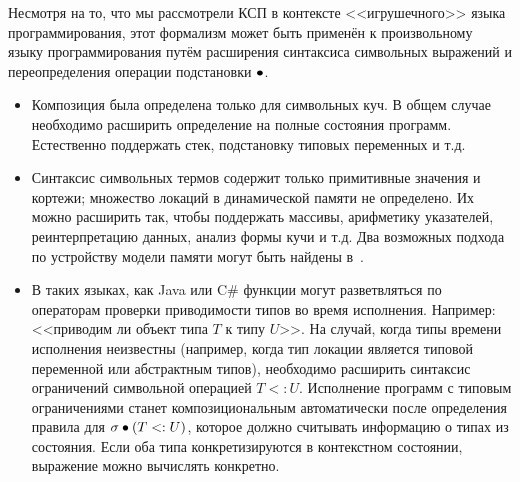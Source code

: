 \begin{remk*}
Несмотря на то, что мы рассмотрели КСП в контексте <<игрушечного>> языка программирования, этот формализм может быть применён к произвольному языку программирования путём расширения синтаксиса символьных выражений и переопределения операции подстановки $\bullet$.
\begin{itemize}
\item Композиция была определена только для символьных куч. В общем случае необходимо расширить определение на полные состояния программ. Естественно поддержать стек, подстановку типовых переменных и т.д.
\item Синтаксис символьных термов содержит только примитивные значения и кортежи; множество локаций в динамической памяти не определено. Их можно расширить так, чтобы поддержать массивы, арифметику указателей, реинтерпретацию данных, анализ формы кучи и т.д. Два возможных подхода по устройству модели памяти могут быть найдены в~\cite{dudka2013byte,gurfinkel2017context}.
\item В таких языках, как Java или C\# функции могут разветвляться по операторам проверки приводимости типов во время исполнения. Например: <<приводим ли объект типа $T$ к типу $U$>>. На случай, когда типы времени исполнения неизвестны (например, когда тип локации является типовой переменной или абстрактным типов), необходимо расширить синтаксис ограничений символьной операцией $T <: U$. Исполнение программ с типовым ограничениями станет композициональным автоматически после определения правила для $\sigma\bullet(T <: U)$, которое должно считывать информацию о типах из состояния. Если оба типа конкретизируются в контекстном состоянии, выражение можно вычислять конкретно.
\end{itemize}
\end{remk*}
